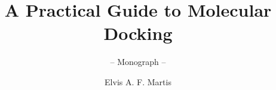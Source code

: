 \documentclass[graybox,envcountchap,sectrefs]{svmono}
\begin{document}
\author{Elvis A. F. Martis}
\title{A Practical Guide to Molecular Docking}
\subtitle{-- Monograph --}
\maketitle

\frontmatter%

%
%
%
%
%


%


\mainmatter%
%




















%

\backmatter%
%
%
\printindex

\end{document}
